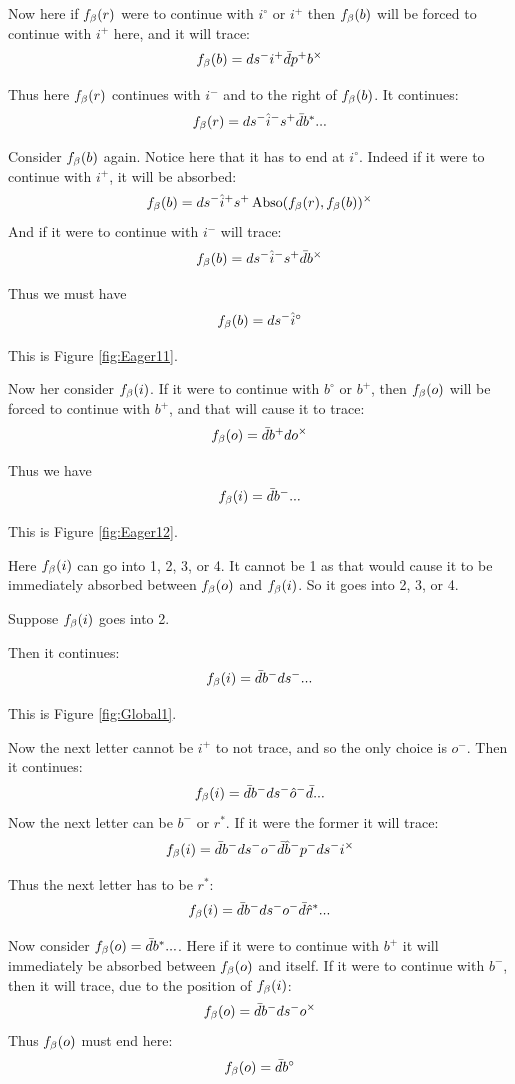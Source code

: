Now here if $f_\beta(r)$ were to continue with $i^\circ$ or $i^+$ then $f_\beta(b)$ will be forced to continue with $i^+$ here, and it will trace:
\[
f_\beta(b) = d s^- i^+ \bar{d} p^+ b^\times
\]

Thus here $f_\beta(r)$ continues with $i^-$ and to the right of $f_\beta(b)$. It continues:
\[
f_\beta(r) = d s^- \hat{i}^- s^+ \bar{d} b^*...
\]

Consider $f_\beta(b)$ again. Notice here that it has to end at $i^\circ$. Indeed if it were to continue with $i^+$, it will be absorbed:
\[
f_\beta(b) = d s^- \hat{i}^+ s^+ \operatorname{Abso}(f_\beta(r), f_\beta(b))^\times
\]
And if it were to continue with $i^-$ will trace:
\[
f_\beta(b) = d s^- \hat{i}^- s^+ \bar{d} b^\times
\]

Thus we must have
\[
f_\beta(b) = d s^- \hat{i}^\circ
\]

This is Figure \ref{fig:Eager11}.

Now her consider $f_\beta(i)$. If it were to continue with $b^\circ$ or $b^+$, then $f_\beta(o)$ will be forced to continue with $b^+$, and that will cause it to trace:
\[
f_\beta(o) = \bar{d} b^+ d o^\times
\]

Thus we have
\[
f_\beta(i) = \bar{d} b^-...
\]

This is Figure \ref{fig:Eager12}.

Here $f_\beta(i)$ can go into 1, 2, 3, or 4. It cannot be 1 as that would cause it to be immediately absorbed between $f_\beta(o)$ and $f_\beta(i)$. So it goes into 2, 3, or 4.

 \label{Global}

Suppose $f_\beta(i)$ goes into 2. 

Then it continues:
\[
f_\beta(i) = \bar{d} b^- d s^-...
\]

This is Figure \ref{fig:Global1}.

Now the next letter cannot be $i^+$ to not trace, and so the only choice is $o^-$. Then it continues:
\[
f_\beta(i) = \bar{d} b^- d s^- \hat{o}^- \bar{d}...
\]
Now the next letter can be $b^-$ or $r^*$. If it were the former it will trace:
\[
f_\beta(i) = \bar{d} b^- d s^- o^- \bar{d} \hat{b}^- p^- d s^- i^\times
\]

Thus the next letter has to be $r^*$:
\[
f_\beta(i) = \bar{d} b^- d s^- o^- \bar{d} \hat{r}^*...
\]

Now consider $f_\beta(o) = \bar{d} b^*...$. Here if it were to continue with $b^+$ it will immediately be absorbed between $f_\beta(o)$ and itself. If it were to continue with $b^-$, then it will trace, due to the position of $f_\beta(i)$:
\[
f_\beta(o) = \bar{d} b^- d s^- o^\times
\]
Thus $f_\beta(o)$ must end here:
\[
f_\beta(o) = \bar{d} b^\circ
\]

